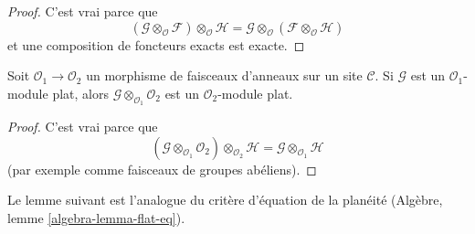 \begin{proof}

C'est vrai parce que
$$
(\mathcal{G} \otimes_\mathcal{O} \mathcal{F}) \otimes_\mathcal{O} \mathcal{H}
=
\mathcal{G} \otimes_\mathcal{O} (\mathcal{F} \otimes_\mathcal{O} \mathcal{H})
$$
et une composition de foncteurs exacts est exacte.

\end{proof}

\begin{lemma}

\label{lemma-flat-change-of-rings}
Soit $\mathcal{O}_1 \to \mathcal{O}_2$ un morphisme de faisceaux d'anneaux
sur un site $\mathcal{C}$. Si $\mathcal{G}$ est un
$\mathcal{O}_1$-module plat, alors
$\mathcal{G} \otimes_{\mathcal{O}_1} \mathcal{O}_2$ est un
$\mathcal{O}_2$-module plat.
\end{lemma}

\begin{proof}

C'est vrai parce que
$$
(\mathcal{G} \otimes_{\mathcal{O}_1} \mathcal{O}_2)
\otimes_{\mathcal{O}_2} \mathcal{H}
=
\mathcal{G} \otimes_{\mathcal{O}_1} \mathcal{H}
$$
(par exemple comme faisceaux de groupes abéliens).

\end{proof}

\noindent
Le lemme suivant est l'analogue du critère d'équation de la planéité (Algèbre, lemme \ref{algebra-lemma-flat-eq}).

